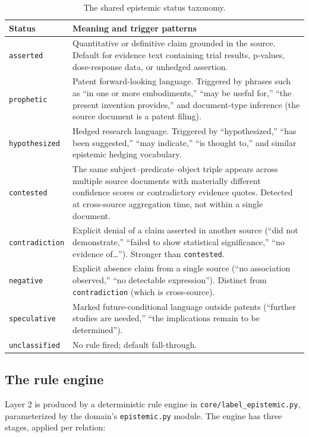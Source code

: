 \begin{table}[t]
\centering
\small
\caption{The shared epistemic status taxonomy.}
\label{tab:epistemic-statuses}
\begin{tabular}{@{}lp{8.5cm}@{}}
\toprule
\textbf{Status} & \textbf{Meaning and trigger patterns} \\
\midrule
\texttt{asserted} & Quantitative or definitive claim grounded in the source. Default for evidence text containing trial results, p-values, dose-response data, or unhedged assertion. \\
\texttt{prophetic} & Patent forward-looking language. Triggered by phrases such as ``in one or more embodiments,'' ``may be useful for,'' ``the present invention provides,'' and document-type inference (the source document is a patent filing). \\
\texttt{hypothesized} & Hedged research language. Triggered by ``hypothesized,'' ``has been suggested,'' ``may indicate,'' ``is thought to,'' and similar epistemic hedging vocabulary. \\
\texttt{contested} & The same subject--predicate--object triple appears across multiple source documents with materially different confidence scores or contradictory evidence quotes. Detected at cross-source aggregation time, not within a single document. \\
\texttt{contradiction} & Explicit denial of a claim asserted in another source (``did not demonstrate,'' ``failed to show statistical significance,'' ``no evidence of\ldots''). Stronger than \texttt{contested}. \\
\texttt{negative} & Explicit absence claim from a single source (``no association observed,'' ``no detectable expression''). Distinct from \texttt{contradiction} (which is cross-source). \\
\texttt{speculative} & Marked future-conditional language outside patents (``further studies are needed,'' ``the implications remain to be determined''). \\
\texttt{unclassified} & No rule fired; default fall-through. \\
\bottomrule
\end{tabular}
\end{table}

\subsection{The rule engine}

Layer 2 is produced by a deterministic rule engine in \texttt{core/label\_epistemic.py}, parameterized by the domain's \texttt{epistemic.py} module. The engine has three stages, applied per relation:

